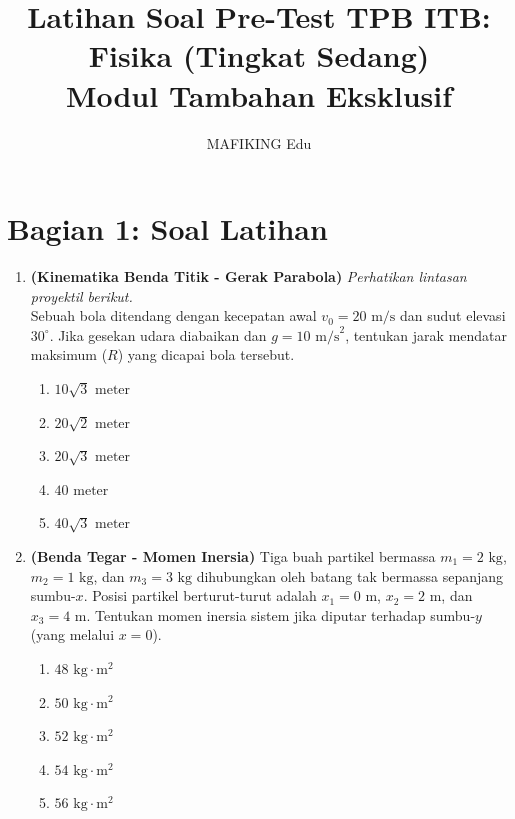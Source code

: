 \documentclass[12pt,a4paper]{article}
\title{\textbf{Latihan Soal Pre-Test TPB ITB: Fisika (Tingkat Sedang)}\\ \large Modul Tambahan Eksklusif}
\author{MAFIKING Edu}
\date{}
\begin{document}
\maketitle

\section*{Bagian 1: Soal Latihan}

\begin{enumerate}
    \item \textbf{(Kinematika Benda Titik - Gerak Parabola)} \textit{Perhatikan lintasan proyektil berikut.} \\
    Sebuah bola ditendang dengan kecepatan awal $v_0 = 20 \text{ m/s}$ dan sudut elevasi $30^\circ$. Jika gesekan udara diabaikan dan $g = 10 \text{ m/s}^2$, tentukan jarak mendatar maksimum ($R$) yang dicapai bola tersebut.
    \begin{center}
    \end{center}
    \begin{enumerate}[label=\alph*.]
        \item $10\sqrt{3} \text{ meter}$
        \item $20\sqrt{2} \text{ meter}$
        \item $20\sqrt{3} \text{ meter}$
        \item $40 \text{ meter}$
        \item $40\sqrt{3} \text{ meter}$
    \end{enumerate}

    \item \textbf{(Benda Tegar - Momen Inersia)} Tiga buah partikel bermassa $m_1 = 2 \text{ kg}$, $m_2 = 1 \text{ kg}$, dan $m_3 = 3 \text{ kg}$ dihubungkan oleh batang tak bermassa sepanjang sumbu-$x$. Posisi partikel berturut-turut adalah $x_1 = 0 \text{ m}$, $x_2 = 2 \text{ m}$, dan $x_3 = 4 \text{ m}$. Tentukan momen inersia sistem jika diputar terhadap sumbu-$y$ (yang melalui $x=0$).
    \begin{enumerate}[label=\alph*.]
        \item $48 \text{ kg}\cdot\text{m}^2$
        \item $50 \text{ kg}\cdot\text{m}^2$
        \item $52 \text{ kg}\cdot\text{m}^2$
        \item $54 \text{ kg}\cdot\text{m}^2$
        \item $56 \text{ kg}\cdot\text{m}^2$
    \end{enumerate}


\end{enumerate}
\end{document}
